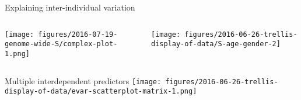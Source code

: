 \documentclass{beamer} %
\begin{document}


\begin{frame}{Explaining inter-individual variation}
\begin{columns}[t]
\begin{column}{0.4\textwidth}

\texttt{[image: figures/2016-07-19-genome-wide-S/complex-plot-1.png]}
\end{column}

\begin{column}{0.6\textwidth}

\texttt{[image: figures/2016-06-26-trellis-display-of-data/S-age-gender-2]}
\end{column}
\end{columns}
\end{frame}

\begin{frame}{Multiple interdependent predictors}
\texttt{[image: figures/2016-06-26-trellis-display-of-data/evar-scatterplot-matrix-1.png]}
\end{frame}

%
%
%
%
%
%
\end{document}

